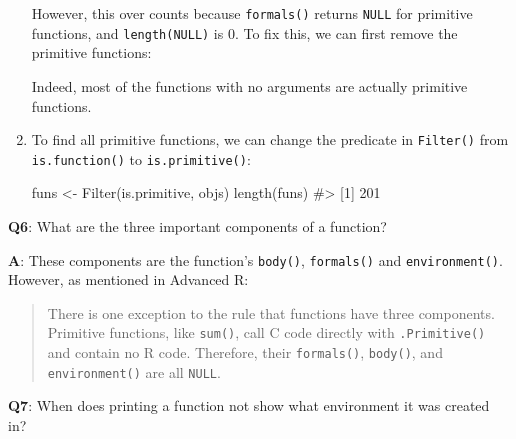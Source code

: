 \documentclass[
]{krantz}
\makeatletter
\newenvironment{Shaded}{\begin{snugshade}}{\end{snugshade}}
\newcommand{\CommentTok}[1]{\textcolor[rgb]{0.56,0.35,0.01}{\textit{#1}}}
\newcommand{\DecValTok}[1]{\textcolor[rgb]{0.00,0.00,0.81}{#1}}
\newcommand{\KeywordTok}[1]{\textcolor[rgb]{0.13,0.29,0.53}{\textbf{#1}}}
\newcommand{\NormalTok}[1]{#1}
\newcommand{\OperatorTok}[1]{\textcolor[rgb]{0.81,0.36,0.00}{\textbf{#1}}}
\newcommand{\StringTok}[1]{\textcolor[rgb]{0.31,0.60,0.02}{#1}}
\newenvironment{kframe}{%
\medskip{}
\setlength{\fboxsep}{.8em}
 \def\at@end@of@kframe{}%
 \ifinner\ifhmode%
  \def\at@end@of@kframe{\end{minipage}}%
  \begin{minipage}{\columnwidth}%
 \fi\fi%
 \def\FrameCommand##1{\hskip\@totalleftmargin \hskip-\fboxsep
 \colorbox{shadecolor}{##1}\hskip-\fboxsep
     \hskip-\linewidth \hskip-\@totalleftmargin \hskip\columnwidth}%
 \MakeFramed {\advance\hsize-\width
   \@totalleftmargin\z@ \linewidth\hsize
   \@setminipage}}%
 {\par\unskip\endMakeFramed%
 \at@end@of@kframe}
\renewenvironment{Shaded}{\begin{kframe}}{\end{kframe}}
\renewcommand{\KeywordTok} [1]{\textcolor[rgb]{0.00,0.44,0.13}{{#1}}}
\renewcommand{\DecValTok}  [1]{\textcolor[rgb]{0.25,0.63,0.44}{{#1}}}
\renewcommand{\StringTok}  [1]{\textcolor[rgb]{0.25,0.44,0.63}{{#1}}}
\renewcommand{\CommentTok} [1]{\textcolor[rgb]{0.38,0.63,0.69}{{#1}}}
\renewcommand{\NormalTok}  [1]{{#1}}
\makeatother
\begin{document}
\begin{enumerate}
  However, this over counts because \texttt{formals()} returns \texttt{NULL} for primitive functions, and \texttt{length(NULL)} is 0. To fix this, we can first remove the primitive functions:

\begin{Shaded}
\end{Shaded}

  Indeed, most of the functions with no arguments are actually primitive functions.
\item
  To find all primitive functions, we can change the predicate in \texttt{Filter()} from \texttt{is.function()} to \texttt{is.primitive()}:

\begin{Shaded}
\begin{Highlighting}[]
\NormalTok{funs <-}\StringTok{ }\KeywordTok{Filter}\NormalTok{(is.primitive, objs)}
\KeywordTok{length}\NormalTok{(funs)}
\CommentTok{#> [1] 201}
\end{Highlighting}
\end{Shaded}
\end{enumerate}

\textbf{{Q6}}: What are the three important components of a function?

\textbf{{A}}: These components are the function's \texttt{body()}, \texttt{formals()} and \texttt{environment()}. However, as mentioned in Advanced R:

\begin{quote}
There is one exception to the rule that functions have three components. Primitive functions, like \texttt{sum()}, call C code directly with \texttt{.Primitive()} and contain no R code. Therefore, their \texttt{formals()}, \texttt{body()}, and \texttt{environment()} are all \texttt{NULL}.
\end{quote}

\textbf{{Q7}}: When does printing a function not show what environment it was created in?
\end{document}
